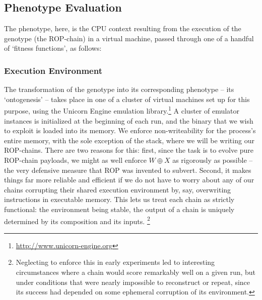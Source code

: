 \subsection{Phenotype Evaluation}
The phenotype, here, is the CPU context resulting from the execution of the genotype (the ROP-chain) in a virtual machine, passed through one of a handful of `fitness functions', as follows:
\subsubsection{Execution Environment}
The transformation of the genotype into its corresponding
phenotype -- its `ontogenesis' -- takes place in one of a cluster
of virtual machines set up for this purpose, using the Unicorn Engine emulation library.\footnote{\url{http://www.unicorn-engine.org}} A cluster of
emulator instances is initialized at the beginning of each run,
and the binary that we wish to exploit is loaded into its memory.
We enforce non-writeability for the process's entire memory, with
the sole exception of the stack, where we will be writing our
ROP-chains. There are two reasons for this: first, since
the task is to evolve pure ROP-chain payloads, we might
as well enforce $W \oplus X$ as rigorously as possible -- the
very defensive measure that ROP was invented to subvert.
Second, it makes things far more reliable and efficient if we
do not have to worry about any of our chains corrupting their
shared execution environment by, say, overwriting instructions in
executable memory. This lets us treat each chain as strictly
functional: the environment being stable, the output of a chain
is uniquely determined by its composition and its inputs.%
\footnote{Neglecting to enforce this in early experiments led to
  interesting circumstances where a chain would score remarkably
  well on a given run, but under conditions that were nearly
  impossible to reconstruct or repeat, since its success had
  depended on some ephemeral corruption of its environment.}

